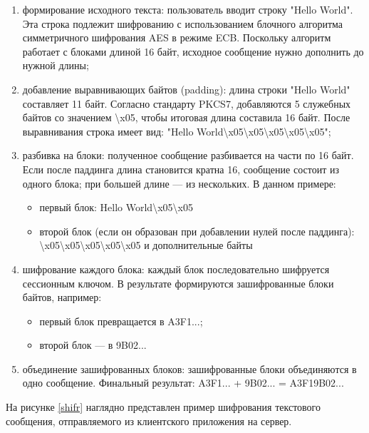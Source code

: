 \begin{enumerate}
	\item формирование исходного текста:  
	пользователь вводит строку "Hello World". Эта строка подлежит шифрованию с использованием блочного алгоритма симметричного шифрования AES в режиме ECB. Поскольку алгоритм работает с блоками длиной 16 байт, исходное сообщение нужно дополнить до нужной длины;
	
	\item добавление выравнивающих байтов (padding):  
	длина строки "Hello World" составляет 11 байт. Согласно стандарту PKCS7, добавляются 5 служебных байтов со значением \textbackslash x05, чтобы итоговая длина составила 16 байт. После выравнивания строка имеет вид:  
	"Hello World\textbackslash x05\textbackslash x05\textbackslash x05\textbackslash x05\textbackslash x05";
	
	\item разбивка на блоки:  
	полученное сообщение разбивается на части по 16 байт. Если после паддинга длина становится кратна 16, сообщение состоит из одного блока; при большей длине — из нескольких. В данном примере:
	\begin{itemize}
		\item первый блок: Hello World\textbackslash x05\textbackslash x05
		\item второй блок (если он образован при добавлении нулей после паддинга): \textbackslash x05\textbackslash x05\textbackslash x05\textbackslash x05\textbackslash x05 и дополнительные байты
	\end{itemize}
	
	\item шифрование каждого блока:  
	каждый блок последовательно шифруется сессионным ключом. В результате формируются зашифрованные блоки байтов, например:
	\begin{itemize}
		\item первый блок превращается в A3F1...;
		\item второй блок — в 9B02...
	\end{itemize}
	
	\item объединение зашифрованных блоков:  
	зашифрованные блоки объединяются в одно сообщение. Финальный результат:  
	A3F1... + 9B02... = A3F19B02...
\end{enumerate}

На рисунке \ref{shifr} наглядно представлен пример шифрования текстового сообщения, отправляемого из клиентского приложения на сервер.

